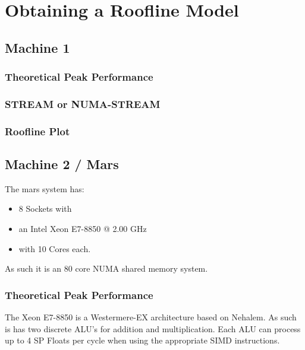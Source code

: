 
\lstset{
	basicstyle=\small,
	language=C
}



\section{Obtaining a Roofline Model}

\subsection{Machine 1}

\subsubsection{Theoretical Peak Performance}

\subsubsection{STREAM or NUMA-STREAM}

\subsubsection{Roofline Plot}


\subsection{Machine 2 / Mars}

The mars system has:
 \begin{itemize}
 	\item 8 Sockets with
	\item an Intel Xeon E7-8850 @ 2.00 GHz
	\item with 10 Cores each.
\end{itemize}

As such it is an 80 core NUMA shared memory system.

\subsubsection{Theoretical Peak Performance}

The Xeon E7-8850 is a Westermere-EX architecture based on Nehalem.\cite{wikichip}
As such is has two discrete ALU's for addition and multiplication.
Each ALU can process up to 4 SP Floats per cycle when using the appropriate SIMD instructions.\cite{agnerorg}

